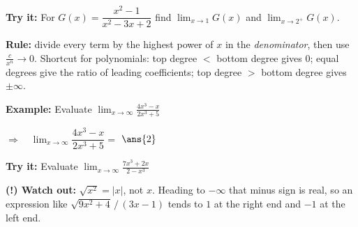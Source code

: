 \documentclass[12pt]{article}
\begin{document}
\begin{tryitbox}
\textbf{Try it:} \quad For $G(x) = \dfrac{x^2-1}{x^2-3x+2}$ find
$\displaystyle\lim_{x\to1} G(x)$ and $\displaystyle\lim_{x\to2^+} G(x)$.\\[2pt]
\end{tryitbox}


\begin{formulabox}
\textbf{Rule:} divide every term by the highest power of $x$ in the
\emph{denominator}, then use $\frac{c}{x^n} \to 0$. Shortcut for polynomials:
top degree $<$ bottom degree gives $0$; equal degrees give the ratio of leading
coefficients; top degree $>$ bottom degree gives $\pm\infty$.
\end{formulabox}

\begin{examplebox}
\textbf{Example:} \quad Evaluate $\displaystyle\lim_{x \to \infty} \frac{4x^3-x}{2x^3+5}$

$\Rightarrow\quad \lim_{x \to \infty} \dfrac{4x^3-x}{2x^3+5} = $ $\ans{2}$
\end{examplebox}

\begin{tryitbox}
\textbf{Try it:} \quad Evaluate $\displaystyle\lim_{x \to \infty} \frac{7x^3+2x}{2-x^3}$\\[2pt]
\end{tryitbox}

\begin{watchoutbox}
\textbf{(!) Watch out:} $\sqrt{x^2} = |x|$, not $x$. Heading to $-\infty$ that
minus sign is real, so an expression like $\sqrt{9x^2+4}\,/\,(3x-1)$ tends to
$1$ at the right end and $-1$ at the left end.
\end{watchoutbox}
\end{document}
